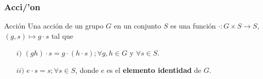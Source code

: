 \begin{frame}\frametitle{Acci/'on}
    \begin{block}{Acción}
        Una acción de un grupo $G$ en un conjunto $S$ es una función 
        $\cdot : G \times S \to S$, $(g, s) \mapsto g \cdot s $  tal que
        \begin{itemize}
            \item[$i)$] $(gh)\cdot s = g \cdot (h \cdot s); \forall g, h \in G$ y $\forall s \in S$.
            \item[$ii)$] $e \cdot s = s; \forall s \in S$, donde $e$ es el \textbf{elemento identidad} de $G$.
        \end{itemize}
    \end{block}
\begin{AgdaAlign}
\begin{code}%
\>[0]\AgdaSpace{}%
\AgdaSpace{}%
\AgdaSymbol{(}\AgdaSpace{}%
\AgdaSymbol{:}\AgdaSpace{}%
\AgdaSpace{}%
\AgdaSymbol{(}\AgdaSpace{}%
\AgdaSpace{}%
\AgdaSymbol{)}\AgdaSpace{}%
\AgdaSymbol{)}\AgdaSpace{}%
\AgdaSymbol{:}\AgdaSpace{}%
\AgdaSpace{}%
\AgdaOperator{\AgdaFunction{\AgdaUnderscore{}}}\AgdaSpace{}%
\<%
\\
\>[0][@{}l@{\AgdaIndent{0}}]%
%
\>[6]\AgdaSpace{}%
\AgdaSymbol{:}\AgdaSpace{}%
\AgdaSpace{}%
\AgdaSpace{}%
\AgdaSpace{}%
\AgdaSpace{}%
\AgdaSpace{}%
\AgdaSpace{}%
\AgdaSpace{}%
\<%
\\
%
\>[6]\AgdaSpace{}%
\AgdaSpace{}%
\AgdaSpace{}%
\AgdaSymbol{=}\AgdaSpace{}%
\AgdaSpace{}%
\AgdaSpace{}%
\AgdaSymbol{(}\AgdaSpace{}%
\AgdaOperator{\AgdaInductiveConstructor{,}}\AgdaSpace{}%
\AgdaSymbol{)}\<%
\\
%
\>[6]\<%
\\
\>[6][@{}l@{\AgdaIndent{0}}]%
\>[8]\AgdaSpace{}%
\AgdaSymbol{:}\AgdaSpace{}%
\AgdaSpace{}%
\AgdaSpace{}%
\AgdaSpace{}%
\AgdaSpace{}%
\AgdaSpace{}%
\AgdaSpace{}%
\AgdaSpace{}%
\<%
\\
%
\>[8]\AgdaSpace{}%
\AgdaSymbol{:}\AgdaSpace{}%
\AgdaSpace{}%
\AgdaSpace{}%
\AgdaSpace{}%
\AgdaSpace{}%
\AgdaSpace{}%
\AgdaSpace{}%
\AgdaSpace{}%
\AgdaSpace{}%
\AgdaSpace{}%
\AgdaSpace{}%
\AgdaSpace{}%
\AgdaSymbol{(}\AgdaSpace{}%
\AgdaSpace{}%
\AgdaSymbol{)}\AgdaSpace{}%
\AgdaSpace{}%


\end{code}
\end{AgdaAlign}
\end{frame}
